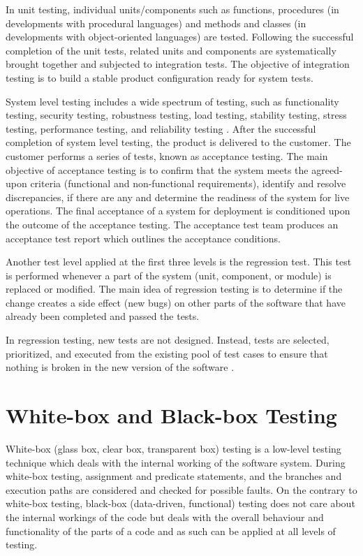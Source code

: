 In unit testing, individual units/components such as functions, procedures (in developments  with procedural languages) and  methods and classes (in developments with object-oriented languages) are tested. Following the successful completion of the unit tests, related units and components are systematically brought together and subjected to integration tests. The objective of integration testing is to build a stable product configuration ready for system tests. 

System level testing includes a wide spectrum of testing, such as functionality testing, security testing, robustness testing, load testing, stability testing, stress testing, performance testing, and reliability testing \autocite{naik2011software}. After the successful completion of system level testing, the product is delivered to the customer. The customer performs a series of tests, known as acceptance testing. The main objective of acceptance testing is to confirm that the system meets the agreed-upon criteria (functional and non-functional requirements), identify and resolve discrepancies, if there are any and determine the readiness of the system for live operations. The final acceptance of a system for deployment is conditioned upon the outcome of the acceptance testing. The acceptance test team produces an acceptance test report which outlines the acceptance conditions. 

Another test level applied at the first three levels is the regression test. This test is performed whenever a part of the system (unit, component, or module) is replaced or modified. The main idea of regression testing is to determine if the change creates a side effect (new bugs) on other parts of the software that have already been completed and passed the tests. 

In regression testing, new tests are not designed. Instead, tests are selected, prioritized, and executed from the existing pool of test cases to ensure that nothing is broken in the new version of the software \autocite{naik2011software}. 

\section{White-box and Black-box Testing}
White-box (glass box, clear box, transparent box) testing is a low-level testing technique which deals with the internal working of the software system. During white-box testing, assignment and predicate statements, and the branches and execution paths are considered and checked for possible faults. On the contrary to white-box testing, black-box (data-driven, functional) testing does not care about the internal workings of the code but deals with the overall behaviour and functionality of the parts of a code and as such can be applied at all levels of testing.

